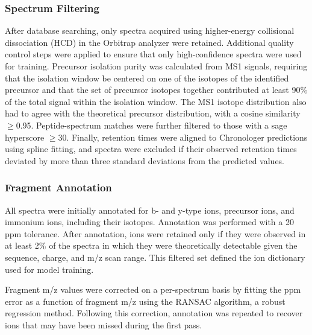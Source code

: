 \documentclass[pdflatex,sn-nature]{sn-jnl}
\begin{document}
\subsubsection{Spectrum Filtering}\label{subsubsec:spectrum-filtering}
After database searching, only spectra acquired using higher-energy collisional dissociation (HCD) in the Orbitrap analyzer were retained. Additional quality control steps were applied to ensure that only high-confidence spectra were used for training. Precursor isolation purity was calculated from MS1 signals, requiring that the isolation window be centered on one of the isotopes of the identified precursor and that the set of precursor isotopes together contributed at least 90\% of the total signal within the isolation window. The MS1 isotope distribution also had to agree with the theoretical precursor distribution, with a cosine similarity $\geq$0.95. Peptide-spectrum matches were further filtered to those with a sage hyperscore $\geq$30. Finally, retention times were aligned to Chronologer predictions using spline fitting, and spectra were excluded if their observed retention times deviated by more than three standard deviations from the predicted values.

\subsubsection{Fragment Annotation}\label{subsubsec:fragment-ion-annotation}
All spectra were initially annotated for b- and y-type ions, precursor ions, and immonium ions, including their isotopes. Annotation was performed with a 20 ppm tolerance. After annotation, ions were retained only if they were observed in at least 2\% of the spectra in which they were theoretically detectable given the sequence, charge, and m/z scan range. This filtered set defined the ion dictionary used for model training.

Fragment m/z values were corrected on a per-spectrum basis by fitting the ppm error as a function of fragment m/z using the RANSAC algorithm, a robust regression method. Following this correction, annotation was repeated to recover ions that may have been missed during the first pass.

\end{document}
